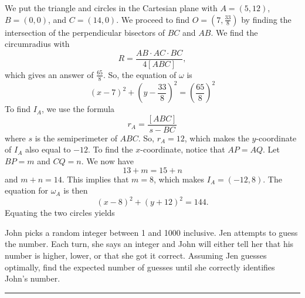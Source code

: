 \documentclass[11pt]{scrartcl}
\begin{document}
We put the triangle and circles in the Cartesian plane with $A = (5, 12)$, $B = (0, 0)$, and $C = (14, 0)$. We proceed to find $O = \left(7, \frac{33}{8}\right)$ by finding the intersection of the perpendicular bisectors of $BC$ and $AB$. We find the circumradius with
\[R = \frac{AB \cdot AC \cdot BC}{4[ABC]},\]
which gives an answer of $\frac{65}{8}$. So, the equation of $\omega$ is
\[(x - 7)^{2} + (y - \frac{33}{8})^{2} = \left(\frac{65}{8}\right)^{2}\]
To find $I_{A}$, we use the formula
\[r_{A} = \frac{[ABC]}{s - BC}\]
where $s$ is the semiperimeter of $ABC$. So, $r_{A} = 12$, which makes the $y$-coordinate of $I_{A}$ also equal to $-12$. To find the $x$-coordinate, notice that $AP = AQ$. Let $BP = m$ and $CQ = n$. We now have
\[13 + m = 15 + n\]
and $m + n = 14$. This implies that $m = 8$, which makes $I_{A} = (-12,8)$. The equation for $\omega_{A}$ is then
\[(x - 8)^{2} + (y + 12)^{2} = 144.\]
Equating the two circles yields


\pagebreak

\begin{problem}
    John picks a random integer between 1 and 1000 inclusive. Jen attempts to guess the number. Each turn, she says an integer and John will either tell her that his number is higher, lower, or that she got it correct. Assuming Jen guesses optimally, find the expected number of guesses until she correctly identifies John's number.
\end{problem}

\vspace{-\baselineskip}\rule{\textwidth}{0.4pt}

\pagebreak
\end{document}
